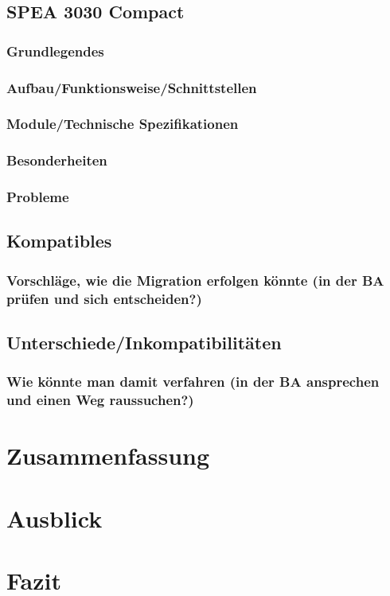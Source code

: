     \subsection{SPEA 3030 Compact}
        \subsubsection{Grundlegendes}
        
        \subsubsection{Aufbau/Funktionsweise/Schnittstellen}


        \subsubsection{Module/Technische Spezifikationen}

        \subsubsection{Besonderheiten }

        \subsubsection{Probleme}

    \subsection{Kompatibles}

        \subsubsection{Vorschläge, wie die Migration erfolgen könnte (in der BA prüfen und sich entscheiden?)}

    \subsection{Unterschiede/Inkompatibilitäten}

        \subsubsection{Wie könnte man damit verfahren (in der BA ansprechen und einen Weg raussuchen?)}

\section{Zusammenfassung}

\section{Ausblick}

    \noindent

    \noindent

\section{Fazit}